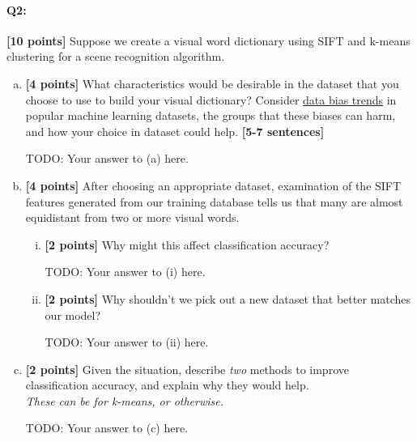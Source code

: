 \paragraph{Q2:} \textbf{[10 points]} Suppose we create a visual word dictionary using SIFT and k-means clustering for a scene recognition algorithm. 
\begin{enumerate}[(a)]
    \item \textbf{[4 points]} What characteristics would be desirable in the dataset that you choose to use to build your visual dictionary? Consider \href{https://www.telusinternational.com/articles/7-types-of-data-bias-in-machine-learning}{data bias trends} in popular machine learning datasets, the groups that these biases can harm, and how your choice in dataset could help. \textbf{[5-7 sentences]}

    \begin{mdframed}
    TODO: Your answer to (a) here.
    \end{mdframed}

    \item \textbf{[4 points]}
    After choosing an appropriate dataset, examination of the SIFT features generated from our training database tells us that many are almost equidistant from two or more visual words. 
    \begin{enumerate} [(i)]
    
    \item \textbf{[2 points]} Why might this affect classification accuracy?
    \begin{mdframed}
    TODO: Your answer to (i) here.
    \end{mdframed}
    
    \item \textbf{[2 points]} Why shouldn't we pick out a new dataset that better matches our model?
    \begin{mdframed}
    TODO: Your answer to (ii) here.
    \end{mdframed}
    \end{enumerate}
    

    \item \textbf{[2 points]}
    Given the situation, describe \emph{two} methods to improve classification accuracy, and explain why they would help.\\ 
    \emph{These can be for k-means, or otherwise.}
    
    \begin{mdframed}
    TODO: Your answer to (c) here.
    \end{mdframed}
    
\end{enumerate}


